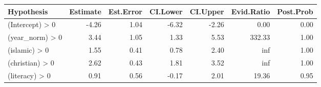 \begin{tabular}{lrrrrrr}
\toprule
Hypothesis & Estimate & Est.Error & CI.Lower & CI.Upper & Evid.Ratio & Post.Prob \\
\midrule
(Intercept) > 0 & -4.26 & 1.04 & -6.32 & -2.26 & 0.00 & 0.00 \\
(year_norm) > 0 & 3.44 & 1.05 & 1.33 & 5.53 & 332.33 & 1.00 \\
(islamic) > 0 & 1.55 & 0.41 & 0.78 & 2.40 & inf & 1.00 \\
(christian) > 0 & 2.62 & 0.43 & 1.81 & 3.52 & inf & 1.00 \\
(literacy) > 0 & 0.91 & 0.56 & -0.17 & 2.01 & 19.36 & 0.95 \\
\bottomrule
\end{tabular}
